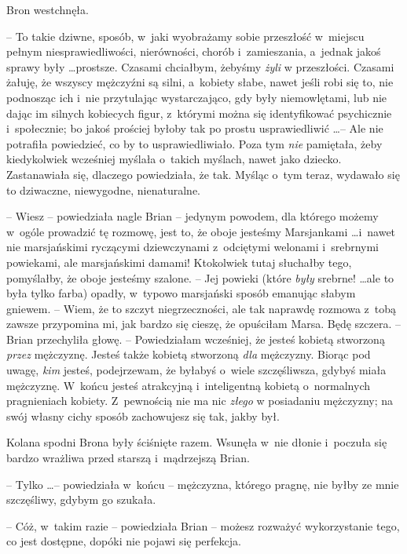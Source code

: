 \documentclass[oneside,polish,11pt,rmheadings]{mwbk}
\begin{document}
Bron westchnęła. 

-- To takie dziwne, sposób, w~jaki wyobrażamy sobie przeszłość w~miejscu pełnym niesprawiedliwości, nierówności, chorób i~zamieszania, a~jednak jakoś sprawy były \ldots  prostsze. Czasami chciałbym, żebyśmy \textit{żyli }w przeszłości. Czasami żałuję, że wszyscy mężczyźni są silni, a~kobiety słabe, nawet jeśli robi się to, nie podnosząc ich i~nie przytulając wystarczająco, gdy były niemowlętami, lub nie dając im silnych kobiecych figur, z~którymi można się identyfikować psychicznie i~społecznie; bo jakoś prościej byłoby tak po prostu usprawiedliwić \ldots  -- Ale nie potrafiła powiedzieć, co by to usprawiedliwiało. Poza tym \textit{nie }pamiętała, żeby kiedykolwiek wcześniej myślała o~takich myślach, nawet jako dziecko. Zastanawiała się, dlaczego powiedziała, że tak. Myśląc o~tym teraz, wydawało się to dziwaczne, niewygodne, nienaturalne. 

-- Wiesz -- powiedziała nagle Brian -- jedynym powodem, dla którego możemy w~ogóle prowadzić tę rozmowę, jest to, że oboje jesteśmy Marsjankami \ldots  i~nawet nie marsjańskimi ryczącymi dziewczynami z~odciętymi welonami i~srebrnymi powiekami, ale marsjańskimi damami! Ktokolwiek tutaj słuchałby tego, pomyślałby, że oboje jesteśmy szalone. -- Jej powieki (które \textit{były }srebrne! \ldots   ale to była tylko farba) opadły, w~typowo marsjański sposób emanując słabym gniewem. -- Wiem, że to szczyt niegrzeczności, ale tak naprawdę rozmowa z~tobą zawsze przypomina mi, jak bardzo się cieszę, że opuściłam Marsa. Będę szczera. --  Brian przechyliła głowę. -- Powiedziałam wcześniej, że jesteś kobietą stworzoną \textit{przez }mężczyznę. Jesteś także kobietą stworzoną \textit{dla }mężczyzny. Biorąc pod uwagę, \textit{kim }jesteś, podejrzewam, że byłabyś o~wiele szczęśliwsza, gdybyś miała mężczyznę. W~końcu jesteś atrakcyjną i~inteligentną kobietą o~normalnych pragnieniach kobiety. Z~pewnością nie ma nic \textit{złego }w posiadaniu mężczyzny; na swój własny cichy sposób zachowujesz się tak, jakby był. 

Kolana spodni Brona były ściśnięte razem.  Wsunęła w~nie dłonie i~poczuła się bardzo wrażliwa przed starszą i~mądrzejszą Brian.

 -- Tylko \ldots  -- powiedziała w~końcu -- mężczyzna, którego pragnę, nie byłby ze mnie szczęśliwy, gdybym go szukała. 

-- Cóż, w~takim razie -- powiedziała Brian -- możesz rozważyć wykorzystanie tego, co jest dostępne, dopóki nie pojawi się perfekcja. 
\end{document}
